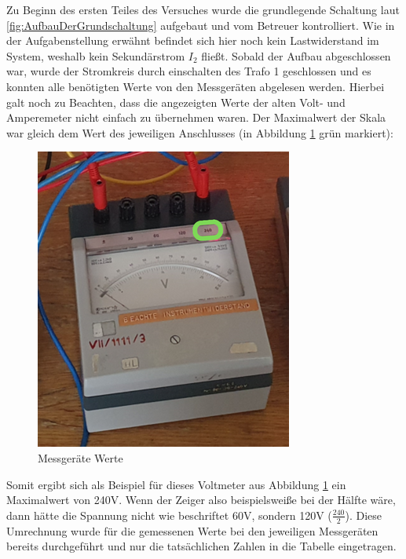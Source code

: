 \documentclass[12pt,a4paper,twoside]{article}
\begin{document}
Zu Beginn des ersten Teiles des Versuches wurde die grundlegende Schaltung laut \ref{fig:AufbauDerGrundschaltung} aufgebaut und vom Betreuer kontrolliert.
Wie in der Aufgabenstellung erwähnt befindet sich hier noch kein Lastwiderstand im System, weshalb kein Sekundärstrom $I_{2}$ fließt. Sobald der Aufbau abgeschlossen war, wurde der Stromkreis durch einschalten des Trafo 1 geschlossen und es konnten alle benötigten Werte von den Messgeräten abgelesen werden.
Hierbei galt noch zu Beachten, dass die angezeigten Werte der alten Volt- und Amperemeter nicht einfach zu übernehmen waren. Der Maximalwert der Skala war gleich dem Wert des jeweiligen Anschlusses (in Abbildung \ref{fig:MessgerätWerte} grün markiert):

\begin{figure}[H]
    \centering
    \includegraphics[width=0.4\linewidth, angle=0]{nudes/VoltmeterBeschriftung.png}
    \caption{Messgeräte Werte}
    \label{fig:MessgerätWerte}
\end{figure}

\noindent
Somit ergibt sich als Beispiel für dieses Voltmeter aus Abbildung \ref{fig:MessgerätWerte} ein Maximalwert von 240V. Wenn der Zeiger also beispielsweiße bei der Hälfte wäre, dann hätte die Spannung nicht wie beschriftet 60V, sondern 120V ($\frac{240}{2}$). Diese Umrechnung wurde für die gemessenen Werte bei den jeweiligen Messgeräten bereits durchgeführt und nur die tatsächlichen Zahlen in die Tabelle eingetragen.

\begin{table}[H]
    \centering
    \caption{Messwerte Leerlauf}
    \label{tab:messwerteLeerlauf}
\end{table}
\end{document}
